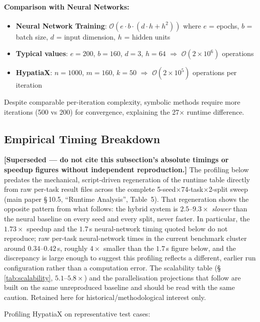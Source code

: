 \documentclass[twoside,11pt]{article}
\begin{document}
\paragraph{Comparison with Neural Networks:}
\begin{itemize}
\item \textbf{Neural Network Training}: $\mathcal{O}(e \cdot b \cdot (d \cdot h + h^2))$ where $e$ = epochs, $b$ = batch size, $d$ = input dimension, $h$ = hidden units
\item \textbf{Typical values}: $e=200$, $b=160$, $d=3$, $h=64$ $\Rightarrow$ $\mathcal{O}(2 \times 10^6)$ operations
\item \textbf{HypatiaX}: $n=1000$, $m=160$, $k=50$ $\Rightarrow$ $\mathcal{O}(2 \times 10^5)$ operations per iteration
\end{itemize}

Despite comparable per-iteration complexity, symbolic methods require more iterations (500 vs 200) for convergence, explaining the 27$\times$ runtime difference.

\subsection{Empirical Timing Breakdown}

\textbf{[Superseded --- do not cite this subsection's absolute timings or
speedup figures without independent reproduction.]} The profiling below
predates the mechanical, script-driven regeneration of the runtime table
directly from raw per-task result files across the complete
5-seed$\times$74-task$\times$2-split sweep (main paper
\S\,10.5, ``Runtime Analysis'', Table~5). That regeneration
shows the opposite pattern from what follows: the hybrid system is
$2.5$--$9.3\times$ \emph{slower} than the neural baseline on every seed
and every split, never faster. In particular, the $1.73\times$ speedup
and the $1.7$\,s neural-network timing quoted below do not reproduce;
raw per-task neural-network times in the current benchmark cluster around
$0.34$--$0.42$\,s, roughly $4\times$ smaller than the $1.7$\,s figure
below, and the discrepancy is large enough to suggest this profiling
reflects a different, earlier run configuration rather than a computation
error. The scalability table (\S\,\ref{tab:scalability}, $5.1$--$5.8\times$)
and the parallelisation projections that follow are built on the same
unreproduced baseline and should be read with the same caution. Retained
here for historical/methodological interest only.

Profiling HypatiaX on representative test cases:
\end{document}
